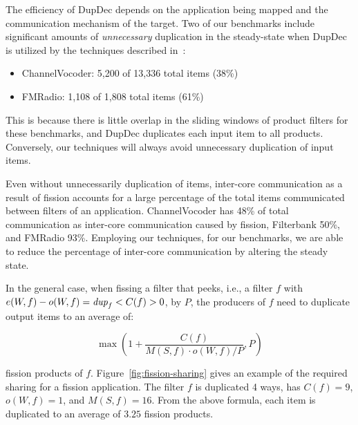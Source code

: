 The efficiency of DupDec depends on the application being mapped and
the communication mechanism of the target.  Two of our benchmarks
include significant amounts of {\it unnecessary} duplication in the
steady-state when DupDec is utilized by the techniques described
in~\cite{gordon-asplos06}:

\begin{itemize}
\item ChannelVocoder: 5,200 of 13,336 total items (38\%)
\item FMRadio: 1,108 of 1,808 total items (61\%) 
\end{itemize}

This is because there is little overlap in the sliding windows of
product filters for these benchmarks, and DupDec duplicates each input
item to all products. Conversely, our techniques will always avoid
unnecessary duplication of input items.

Even without unnecessarily duplication of items, inter-core
communication as a result of fission accounts for a large percentage
of the total items communicated between filters of an application.
ChannelVocoder has 48\% of total communication as inter-core
communication caused by fission, Filterbank 50\%, and FMRadio 93\%.
Employing our techniques, for our benchmarks, we are able to reduce
the percentage of inter-core communication by altering the steady
state.

In the general case, when fissing a filter that peeks, i.e., a filter
$f$ with $e(W, f) - o(W, f) = \mbox{\it dup}_f < C(f) > 0$, by $P$, the producers
of $f$ need to duplicate output items to an average of:

\[ \max \left ( 1 + \frac{C(f)}{M(S, f) \cdot o(W, f) / P}, P \right )\]

\noindent fission products of $f$.  Figure~\ref{fig:fission-sharing}
gives an example of the required sharing for a fission application.
The filter $f$ is duplicated 4 ways, has $C(f) = 9$, $o(W, f) = 1$,
and $M(S, f) = 16$.  From the above formula, each item is duplicated
to an average of $3.25$ fission products.

